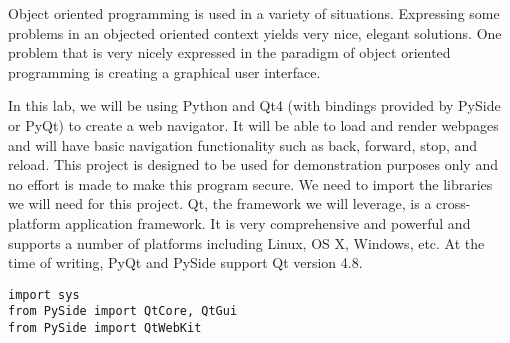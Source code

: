 
Object oriented programming is used in a variety of situations.
Expressing some problems in an objected oriented context yields very nice, elegant solutions.
One problem that is very nicely expressed in the paradigm of object oriented programming is creating a graphical user interface.

In this lab, we will be using Python and Qt4 (with bindings provided by PySide or PyQt) to create a web navigator.
It will be able to load and render webpages and will have basic navigation functionality such as back, forward, stop, and reload.
This project is designed to be used for demonstration purposes only and no effort is made to make this program secure.
We need to import the libraries we will need for this project.
Qt, the framework we will leverage, is a cross-platform application framework.
It is very comprehensive and powerful and supports a number of platforms including Linux, OS X, Windows, etc.
At the time of writing, PyQt and PySide support Qt version 4.8.
\begin{lstlisting}
import sys
from PySide import QtCore, QtGui
from PySide import QtWebKit
\end{lstlisting}

